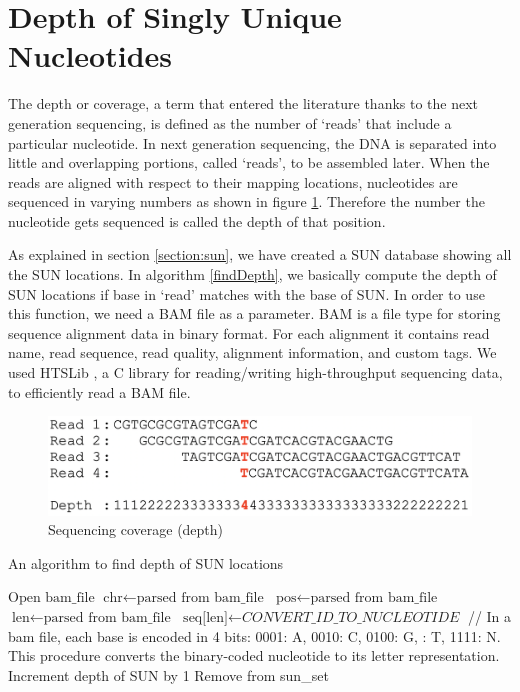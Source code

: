 \section{Depth of Singly Unique Nucleotides}
The depth or coverage, a term that entered the literature thanks to the next generation sequencing, is defined as the number of `reads' that include a particular nucleotide. In next generation sequencing, the DNA is separated into little and overlapping portions, called `reads', to be assembled later. When the reads are aligned with respect to their mapping locations, nucleotides are sequenced in varying numbers as shown in figure \ref{depthOfCoverage}. Therefore the number the nucleotide gets sequenced is called the depth of that position.

As explained in section \ref{section:sun}, we have created a SUN database showing all the SUN locations. In algorithm \ref{findDepth}, we basically compute the depth of SUN locations if base in `read' matches with the base of SUN. In order to use this function, we need a BAM file as a parameter. BAM \cite{li2009sequence} is a file type for storing sequence alignment data in binary format. For each alignment it contains read name, read sequence, read quality, alignment information, and custom tags. We used HTSLib \cite{htslib}, a C library for reading/writing high-throughput sequencing data, to efficiently read a BAM file.
\begin{figure}[ht]
    \centering
    \includegraphics[scale=0.4]{images/depthofcoverage.png}
    \caption{Sequencing coverage (depth)}
    \label{depthOfCoverage}
\end{figure}
\begin{algorithm}
\caption{An algorithm to find depth of SUN locations}
\label{findDepth}
\begin{algorithmic}[1]
\State $\text{Open bam\_file}$
\State $\text{chr} \gets \text{parsed from bam\_file}$
\State $\text{pos} \gets \text{parsed from bam\_file}$
\State $\text{len} \gets \text{parsed from bam\_file}$
\State $\text{seq[len]} \gets \textit{CONVERT\_ID\_TO\_NUCLEOTIDE}$ // In a bam file, 
\State each base is encoded in 4 bits: 0001: A, 0010: C, 0100: G, 
: T, 1111: N. This procedure converts the binary-coded 
\State nucleotide to its letter representation.
\State Increment depth of SUN by 1
\Else
\State Remove from sun\_set
\EndIf
\EndFor
\EndFor
\EndIf
\EndProcedure
\end{algorithmic}
\end{algorithm}

